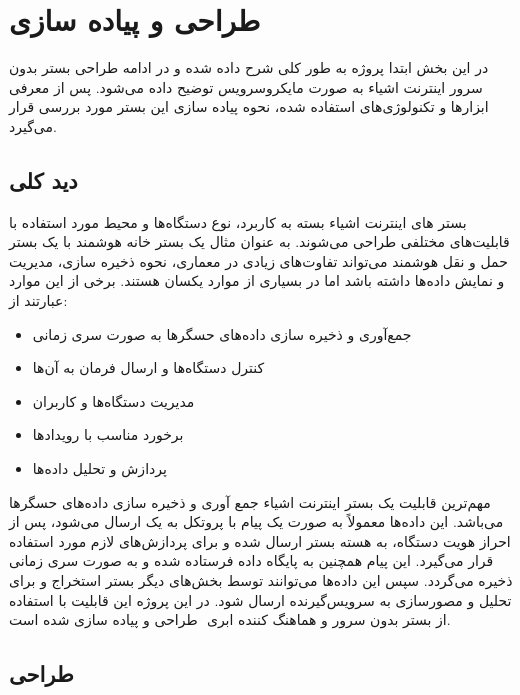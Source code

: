 \chapter{طراحی و پیاده سازی}\label{chapter3}

در این بخش ابتدا پروژه به طور کلی شرح داده شده و در ادامه طراحی بستر بدون سرور اینترنت اشیاء به صورت مایکروسرویس توضیح داده می‌شود. پس از معرفی ابزارها و تکنولوژی‌های استفاده شده، نحوه پیاده سازی این بستر مورد بررسی قرار می‌گیرد.

\section{دید کلی}

بستر های اینترنت اشیاء بسته به کاربرد، نوع دستگاه‌ها و محیط مورد استفاده با قابلیت‌های مختلفی طراحی می‌شوند. به عنوان مثال یک بستر خانه هوشمند با یک بستر حمل و نقل هوشمند می‌تواند تفاوت‌های زیادی در معماری، نحوه ذخیره سازی، مدیریت و نمایش داده‌ها داشته باشد اما در بسیاری از موارد یکسان هستند. برخی از این موارد عبارتند از:
\begin{itemize}
	
	\item جمع‌‌آوری و ذخیره سازی داده‌های حسگر‌ها به صورت سری زمانی
	
	\item کنترل دستگاه‌ها و ارسال فرمان به آن‌ها
	
	\item مدیریت دستگاه‌ها و کاربران
	
	\item برخورد مناسب با رویداد‌ها
	
	\item پردازش و تحلیل داده‌ها
	
\end{itemize}

مهم‌ترین قابلیت یک بستر اینترنت اشیاء جمع آوری و ذخیره سازی داده‌های حسگر‌ها می‌باشد. این داده‌ها معمولاً به صورت یک پیام با پروتکل  به یک  ارسال می‌شود، پس از احراز هویت دستگاه، به هسته بستر ارسال شده و برای پردازش‌های لازم مورد استفاده قرار می‌گیرد. این پیام همچنین به پایگاه داده فرستاده شده و به صورت سری زمانی ذخیره می‌گردد. سپس این داده‌ها می‌توانند توسط بخش‌های دیگر بستر استخراج و برای تحلیل و مصورسازی به سرویس‌گیرنده ارسال شود. در این پروژه این قابلیت با استفاده از بستر بدون سرور  و هماهنگ کننده ابری ‌ طراحی و پیاده سازی شده است.

\section{طراحی}

